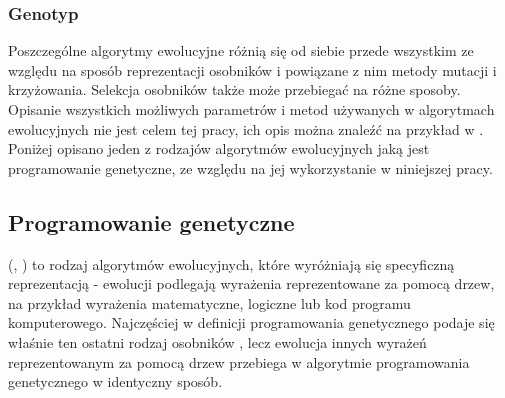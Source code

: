 \subsubsection{Genotyp}
Poszczególne algorytmy ewolucyjne różnią się od siebie przede wszystkim ze względu na sposób reprezentacji osobników i powiązane z nim metody mutacji i krzyżowania. Selekcja osobników także może przebiegać na różne sposoby. Opisanie wszystkich możliwych parametrów i metod używanych w algorytmach ewolucyjnych nie jest celem tej pracy, ich opis można znaleźć na przykład w \cite{Luke2009Metaheuristics}. Poniżej opisano jeden z rodzajów algorytmów ewolucyjnych jaką jest programowanie genetyczne, ze względu na jej wykorzystanie w niniejszej pracy.


\subsection{Programowanie genetyczne}

 (, ) to rodzaj algorytmów ewolucyjnych, które wyróżniają się specyficzną reprezentacją - ewolucji podlegają wyrażenia reprezentowane za pomocą drzew, na przykład wyrażenia matematyczne, logiczne lub kod programu komputerowego. Najczęściej w definicji programowania genetycznego podaje się właśnie ten ostatni rodzaj osobników \cite{Luke2009Metaheuristics} \cite{Poli:2008:FGG:1796422}, lecz ewolucja innych wyrażeń reprezentowanym za pomocą drzew przebiega w algorytmie programowania genetycznego w identyczny sposób.

